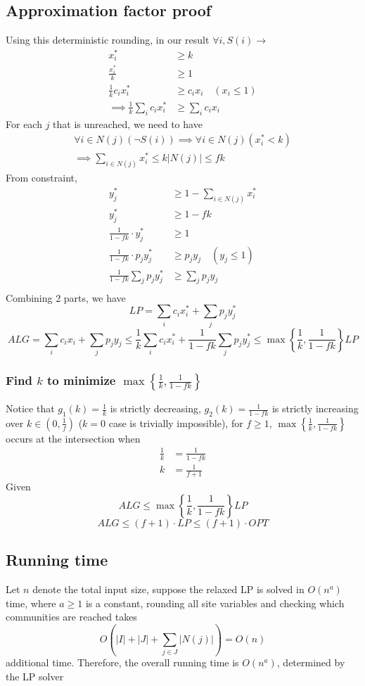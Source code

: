 \documentclass[10pt]{article}
\theoremstyle{definition}
\begin{document}
\subsection{Approximation factor proof}
Using this deterministic rounding, in our result $\forall i, S(i) \rightarrow$
\begin{align*}
x_i^* &\geq k\\
\frac{x_i^*}{k} &\geq 1  \\
\frac{1}{k}c_i x_i^* &\geq c_i x_i \quad (x_i \leq 1)\\ 
\implies \frac{1}{k} \sum_i c_i x_i^* &\geq \sum_i c_i x_i
\end{align*}
For each $j$ that is unreached, we need to have 
\begin{align*}
\forall i \in N(j) (\neg S(i) ) \implies \forall i \in N(j) (x^*_i < k)\\
\implies \sum_{i \in N(j)} x^*_i \leq k|N(j)| \leq fk
\end{align*}
From constraint, 
\begin{align*}
  y_j^* &\geq 1 - \sum_{i\in N(j)} x_i^* \\
  y^*_j &\geq 1 - fk\\
  \frac{1}{1 - fk}\cdot y^*_j&\geq 1\\
  \frac{1}{1 - fk}\cdot p_j y^*_j &\geq p_j y_j \quad (y_j \leq 1)\\
  \frac{1}{1 - fk}\sum_j p_j y^*_j &\geq \sum_j p_j y_j\\
\end{align*}
Combining 2 parts, we have 
\[LP = \sum_i c_i x_i^* + \sum_j p_j y_j^*\]
\[ALG = \sum_i c_i x_i + \sum_j p_j y_j 
\leq \frac{1}{k} \sum_i c_i x_i^* + \frac{1}{1 - fk}\sum_j p_j y_j^* 
\leq \max\left\{\frac{1}{k}, \frac{1}{1 - fk}\right\} LP\]
\subsubsection*{Find $k$ to minimize $\max\left\{\frac{1}{k}, \frac{1}{1 - fk}\right\}$}
Notice that $g_1(k) = \frac{1}{k}$ is strictly decreasing, $g_2(k) = \frac{1}{1 - fk}$ is strictly increasing over $k \in (0, \frac{1}{f})$ ($k=0$ case is trivially impossible), for $f \geq 1$, 
$\max\left\{\frac{1}{k}, \frac{1}{1 - fk}\right\} $ occurs at the intersection when 
\begin{align*}
\frac{1}{k} &= \frac{1}{1 - fk}\\
k &= \frac{1}{f + 1}
\end{align*}
Given 
\[ALG \leq \max\left\{\frac{1}{k}, \frac{1}{1 - fk}\right\} LP\]
\[ALG \leq (f + 1) \cdot LP \leq (f + 1) \cdot OPT\]
\subsection{Running time}
Let $n$ denote the total input size, suppose the relaxed LP is solved in $O(n^a)$ time,
where $a\geq 1$ is a constant, rounding all site variables and checking which communities
are reached takes
\[O\left(|I|+|J|+\sum_{j\in J}|N(j)|\right)=O(n)\]
additional time.
Therefore, the overall running time is
$O(n^a)$, determined by the LP solver
\end{document}
